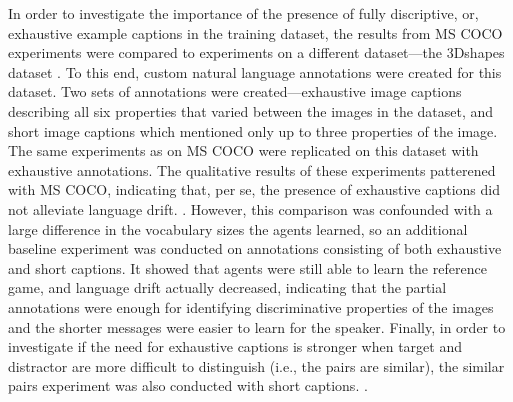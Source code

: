 In order to investigate the importance of the presence of fully discriptive, or, exhaustive example captions in the training dataset, the results from MS COCO experiments were compared to experiments on a different dataset---the 3Dshapes dataset \parencite{burgess20183d}. To this end, custom natural language annotations were created for this dataset. Two sets of annotations were created---exhaustive image captions describing all six properties that varied between the images in the dataset, and short image captions which mentioned only up to three properties of the image.
The same experiments as on MS COCO were replicated on this dataset with exhaustive annotations. The qualitative results of these experiments patterened with MS COCO, indicating that, per se, the presence of exhaustive captions did not alleviate language drift. . However, this comparison was confounded with a large difference in the vocabulary sizes the agents learned, so an additional baseline experiment was conducted on annotations consisting of both exhaustive and short captions. It showed that agents were still able to learn the reference game, and language drift actually decreased, indicating that the partial annotations were enough for identifying discriminative properties of the images and the shorter messages were easier to learn for the speaker. Finally, in order to investigate if the need for exhaustive captions is stronger when target and distractor are more difficult to distinguish (i.e., the pairs are similar), the similar pairs experiment was also conducted with short captions. .


